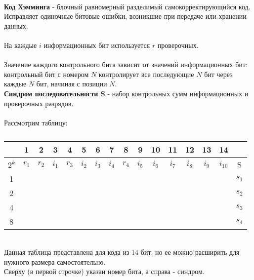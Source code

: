 \\\textbf{Код Хэмминга} - блочный равномерный разделимый самокорректирующийся код. Исправляет одиночные битовые ошибки, возникшие при передаче или хранении данных.
\\
\\На каждые $i$ информационных бит используется $r$ проверочных.
\\
\\Значение каждого контрольного бита зависит от значений информационных бит: контрольный бит с номером $N$ контролирует все последующие $N$ бит через каждые $N$ бит, начиная с позиции $N$.
\\\textbf{Синдром последовательности S} - набор контрольных сумм информационных и проверочных разрядов.
\\
\\Рассмотрим таблицу:
\begin{table}[h]
\caption{}
\begin{tabular}{|c|c|c|c|c|c|c|c|c|c|c|c|c|c|c|c|}
\hline
& 1 & 2 & 3 & 4 & 5 & 6 & 7 & 8 & 9 & 10 & 11 & 12 & 13 & 14 & \\
\hline
$2^k$ & $r_{1}$ & $r_{2}$ & $i_{1}$ & $r_{3}$ & $i_{2}$ & $i_{3}$ & $i_{4}$ & $r_{4}$ & $i_{5}$ & $i_{6}$ & $i_{7}$ & $i_{8}$ & $i_{9}$ & $i_{10}$ & S\\
\hline
1 & \cellcolor{Gray1}{X} & & \cellcolor{Gray1}{X} & & \cellcolor{Gray1}{X} & & \cellcolor{Gray1}{X} & & \cellcolor{Gray1}{X} & & \cellcolor{Gray1}{X} & & \cellcolor{Gray1}{X} & & $s_{1}$\\
\hline
2 & & \cellcolor{Gray2}{X} & \cellcolor{Gray2}{X} & & & \cellcolor{Gray2}{X} & \cellcolor{Gray2}{X} & & & \cellcolor{Gray2}{X} & \cellcolor{Gray2}{X} & & & \cellcolor{Gray2}{X} & $s_{2}$ \\
\hline
4 & & & & \cellcolor{Gray3}{X} & \cellcolor{Gray3}{X} & \cellcolor{Gray3}{X} & \cellcolor{Gray3}{X} & & & & & \cellcolor{Gray3}{X} & \cellcolor{Gray3}{X} & \cellcolor{Gray3}{X} & $s_{3}$ \\
\hline
8 & & & & & & & & \cellcolor{Gray4}{X} & \cellcolor{Gray4}{X} & \cellcolor{Gray4}{X} & \cellcolor{Gray4}{X} & \cellcolor{Gray4}{X} & \cellcolor{Gray4}{X} & \cellcolor{Gray4}{X} & $s_{4}$ \\
\hline
\end{tabular}
\end{table}
\\Данная таблица представлена для кода из 14 бит, но ее можно расширить для нужного размера самостоятельно.
\\Сверху (в первой строчке) указан номер бита, а справа - синдром.
